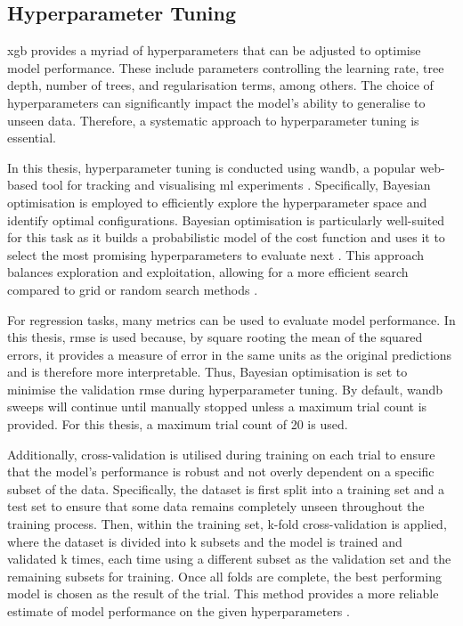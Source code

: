 \subsection{Hyperparameter Tuning}

\acrshort{xgb} provides a myriad of hyperparameters that can be adjusted to optimise model performance. These include parameters controlling the learning rate, tree depth, number of trees, and regularisation terms, among others. The choice of hyperparameters can significantly impact the model's ability to generalise to unseen data. Therefore, a systematic approach to hyperparameter tuning is essential. 

In this thesis, hyperparameter tuning is conducted using \acrfull{wandb}, a popular web-based tool for tracking and visualising \acrshort{ml} experiments . Specifically, Bayesian optimisation is employed to efficiently explore the hyperparameter space and identify optimal configurations. Bayesian optimisation is particularly well-suited for this task as it builds a probabilistic model of the cost function and uses it to select the most promising hyperparameters to evaluate next . This approach balances exploration and exploitation, allowing for a more efficient search compared to grid or random search methods . 

For regression tasks, many metrics can be used to evaluate model performance. In this thesis, \acrfull{rmse} is used because, by square rooting the mean of the squared errors, it provides a measure of error in the same units as the original predictions and is therefore more interpretable. Thus, Bayesian optimisation is set to minimise the validation \acrshort{rmse} during hyperparameter tuning. By default, \acrshort{wandb} sweeps will continue until manually stopped unless a maximum trial count is provided. For this thesis, a maximum trial count of 20 is used. 

Additionally, cross-validation is utilised during training on each trial to ensure that the model's performance is robust and not overly dependent on a specific subset of the data. Specifically, the dataset is first split into a training set and a test set to ensure that some data remains completely unseen throughout the training process. Then, within the training set, k-fold cross-validation is applied, where the dataset is divided into k subsets and the model is trained and validated k times, each time using a different subset as the validation set and the remaining subsets for training. Once all folds are complete, the best performing model is chosen as the result of the trial. This method provides a more reliable estimate of model performance on the given hyperparameters .

